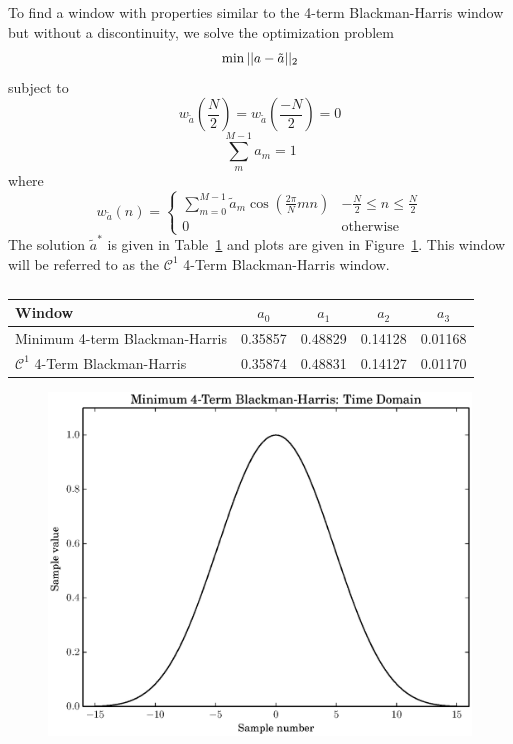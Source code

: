 To find a window with properties similar to the 4-term Blackman-Harris window
but without a discontinuity, we solve the optimization problem
\[
        \min||a-\tilde{a}||_2 \\
\]
subject to
\[
        w_{\tilde{a}} \left( \frac{N}{2} \right)
            = w_{\tilde{a}} \left( \frac{-N}{2} \right) = 0
\]
\[
        \sum_{m}^{M-1} a_{m} = 1
\]
where
\[
    w_{\tilde{a}}(n) = \begin{cases}
        \sum_{m=0}^{M-1}\tilde{a}_{m}\cos \left( \frac{2\pi}{N}mn \right) & -\frac{N}{2} \leq n
        \leq \frac{N}{2} \\
        0 & \text{otherwise}
    \end{cases}
\]
The solution $\tilde{a}^{\ast}$ is given in Table~\ref{tab:optblackman} and
plots are given in Figure~\ref{plot:opt_blackman}. This window will be referred
to as the $\mathcal{C}^{1}$ 4-Term Blackman-Harris window.

\begin{table}
    \caption{\label{tab:optblackman}}
    \begin{center}
        \begin{tabular}{l c c c c }
            Window & $a_0$ & $a_1$ & $a_2$ & $a_3$ \\
            \hline
            Minimum 4-term Blackman-Harris & 0.35857 & 0.48829 & 0.14128 &
            0.01168 \\
            $\mathcal{C}^{1}$ 4-Term Blackman-Harris & 0.35874 & 0.48831 &
            0.14127 & 0.01170
        \end{tabular}
    \end{center}
\end{table}

\begin{figure}[!t]
    \caption{\label{plot:opt_blackman}}
    \includegraphics[width=\textwidth]{plots/min4_blackman_td.eps}
\end{figure}

